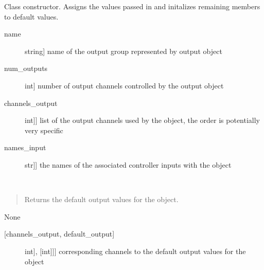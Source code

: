 \documentclass[letterpaper,10pt,english]{sphinxmanual}
\begin{document}
\begin{fulllineitems}
\begin{fulllineitems}
\label{\detokenize{specific:NeckTiltOutput.NeckTiltOutput.__init__}}
\sphinxAtStartPar
Class constructor. Assigns the values passed in and initalizes remaining members to default values.

\sphinxAtStartPar
{}
\begin{description}
\item[{name}] \leavevmode{[}string{]}
\sphinxAtStartPar
name of the output group represented by output object

\item[{num\_outputs}] \leavevmode{[}int{]}
\sphinxAtStartPar
number of output channels controlled by the output object

\item[{channels\_output}] \leavevmode{[}{[}int{]}{]}
\sphinxAtStartPar
list of the output channels used by the object, the order is potentially very specific

\item[{names\_input}] \leavevmode{[}{[}str{]}{]}
\sphinxAtStartPar
the names of the associated controller inputs with the object

\end{description}

\end{fulllineitems}


\begin{fulllineitems}
\label{\detokenize{specific:NeckTiltOutput.NeckTiltOutput.get_default_outputs}}~\begin{quote}

\sphinxAtStartPar
Returns the default output values for the object.
\end{quote}

\sphinxAtStartPar
{}

\sphinxAtStartPar
None

\sphinxAtStartPar
{}
\begin{description}
\item[{{[}channels\_output, default\_output{]}}] \leavevmode{[}{[}{[}int{]}, {[}int{]}{]}{]}
\sphinxAtStartPar
corresponding channels to the default output values for the object


\end{description}
\end{fulllineitems}
\end{fulllineitems}
\end{document}
